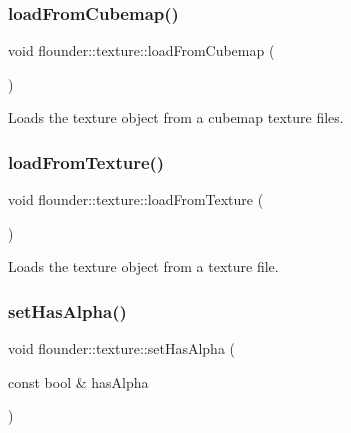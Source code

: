 \subsubsection{\texorpdfstring{load\+From\+Cubemap()}{loadFromCubemap()}}
{\footnotesize\ttfamily void flounder\+::texture\+::load\+From\+Cubemap (\begin{DoxyParamCaption}{ }\end{DoxyParamCaption})\hspace{0.3cm}{\ttfamily [private]}}



Loads the texture object from a cubemap texture files. 

\mbox{\label{classflounder_1_1texture_ae16fb1bee340a680060e45dfa527e57d}} 
\subsubsection{\texorpdfstring{load\+From\+Texture()}{loadFromTexture()}}
{\footnotesize\ttfamily void flounder\+::texture\+::load\+From\+Texture (\begin{DoxyParamCaption}{ }\end{DoxyParamCaption})\hspace{0.3cm}{\ttfamily [private]}}



Loads the texture object from a texture file. 

\mbox{\label{classflounder_1_1texture_ac05209e3a9686903a336575ac71b8f0e}} 
\subsubsection{\texorpdfstring{set\+Has\+Alpha()}{setHasAlpha()}}
{\footnotesize\ttfamily void flounder\+::texture\+::set\+Has\+Alpha (\begin{DoxyParamCaption}\item[{const bool \&}]{has\+Alpha }\end{DoxyParamCaption})\hspace{0.3cm}{\ttfamily [inline]}}



